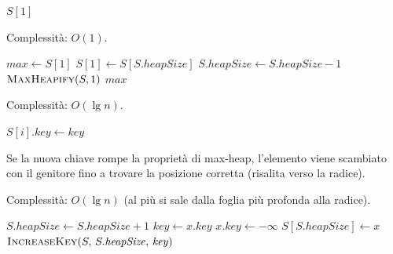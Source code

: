 \begin{algorithm}[H]
	\caption{\textsc{Max}$(S)$}
	\Return $S[1]$\;
\end{algorithm}

Complessità: $O(1)$.

\begin{algorithm}[H]
	\caption{\textsc{ExtractMax}$(S)$}
	$\mathit{max} \gets S[1]$\;
	$S[1] \gets S[S.\mathit{heapSize}]$\;
	$S.\mathit{heapSize} \gets S.\mathit{heapSize} - 1$\;
	$\textsc{MaxHeapify}(S, 1)$\;
	\Return $\mathit{max}$\;
\end{algorithm}

Complessità: $O(\lg n)$.

\begin{algorithm}[H]
	\caption{\textsc{IncreaseKey}$(S, i, \mathit{key})$}
	$S[i].\mathit{key} \gets \mathit{key}$\;
\end{algorithm}

\begin{softnote}
	Se la nuova chiave rompe la proprietà di max-heap, l'elemento viene
	scambiato con il genitore fino a trovare la posizione corretta
	(risalita verso la radice).
\end{softnote}

Complessità: $O(\lg n)$ (al più si sale dalla foglia più profonda
alla radice).

\begin{algorithm}[H]
	\caption{\textsc{Insert}$(S, x)$}
	$S.\mathit{heapSize} \gets S.\mathit{heapSize} + 1$\;
	$\mathit{key} \gets x.\mathit{key}$\;
	$x.\mathit{key} \gets -\infty$
	$S[S.\mathit{heapSize}] \gets x$\;
	$\textsc{IncreaseKey}(S,\, S.\mathit{heapSize},\, \mathit{key})$
\end{algorithm}


